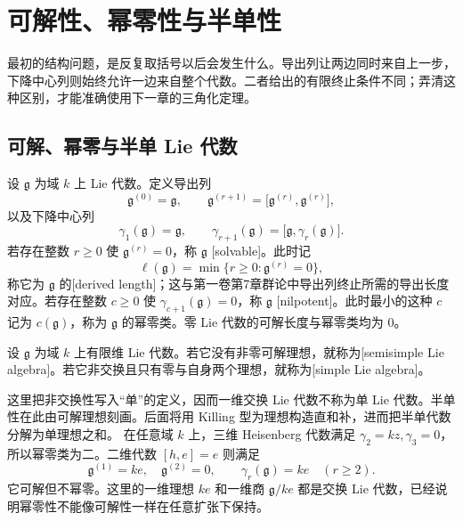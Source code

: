
\section{可解性、幂零性与半单性}
\label{b5:sec:1104}


%
%
%

最初的结构问题，是反复取括号以后会发生什么。导出列让两边同时来自上一步，下降中心列则始终允许一边来自整个代数。二者给出的有限终止条件不同；弄清这种区别，才能准确使用下一章的三角化定理。

\subsection{可解、幂零与半单 Lie 代数}
\label{b5:subsec:1104:01}

\begin{definition}\label{b5:def:lie-solvable-nilpotent}
	设 \(\mathfrak g\) 为域 \(k\) 上 Lie 代数。定义导出列
	\[
		\mathfrak g^{(0)}=\mathfrak g,\qquad \mathfrak g^{(r+1)}=\bigl[\mathfrak g^{(r)},\mathfrak g^{(r)}\bigr],
	\]
	以及下降中心列
	\[
		\gamma_1(\mathfrak g)=\mathfrak g,\qquad \gamma_{r+1}(\mathfrak g)=\bigl[\mathfrak g,\gamma_r(\mathfrak g)\bigr].
	\]
	若存在整数 \(r\ge0\) 使 \(\mathfrak g^{(r)}=0\)，称 \(\mathfrak g\) [solvable]。此时记
	\[
		\ell(\mathfrak g)=\min\{r\ge0:\mathfrak g^{(r)}=0\},
	\]
	称它为 \(\mathfrak g\) 的[derived length]；这与第一卷第7章群论中导出列终止所需的导出长度对应。若存在整数 \(c\ge0\) 使 \(\gamma_{c+1}(\mathfrak g)=0\)，称 \(\mathfrak g\) [nilpotent]。此时最小的这种 \(c\) 记为 \(c(\mathfrak g)\)，称为 \(\mathfrak g\) 的幂零类。零 Lie 代数的可解长度与幂零类均为 \(0\)。
\end{definition}
\begin{definition}\label{b5:def:lie-semisimple-simple}
	设 \(\mathfrak g\) 为域 \(k\) 上有限维 Lie 代数。若它没有非零可解理想，就称为[semisimple Lie algebra]。若它非交换且只有零与自身两个理想，就称为[simple Lie algebra]。
\end{definition}
这里把非交换性写入“单”的定义，因而一维交换 Lie 代数不称为单 Lie 代数。半单性在此由可解理想刻画。后面将用 Killing 型为理想构造直和补，进而把半单代数分解为单理想之和。
\ProseParagraphBreak
在任意域 \(k\) 上，三维 Heisenberg 代数满足 \(\gamma_2=kz,\gamma_3=0\)，所以幂零类为二。二维代数 \([h,e]=e\) 则满足
\[
	\mathfrak g^{(1)}=ke,\quad \mathfrak g^{(2)}=0,\qquad \gamma_r(\mathfrak g)=ke\quad(r\ge2).
\]
它可解但不幂零。这里的一维理想 \(ke\) 和一维商 \(\mathfrak g/ke\) 都是交换 Lie 代数，已经说明幂零性不能像可解性一样在任意扩张下保持。

